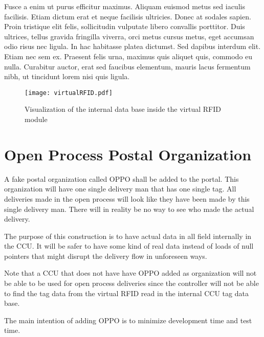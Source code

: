 \documentclass[titlepage = true]{scrartcl}
\begin{document}
Fusce a enim ut purus efficitur maximus. Aliquam euismod metus sed iaculis facilisis. Etiam dictum erat et neque facilisis ultricies. Donec at sodales sapien. Proin tristique elit felis, sollicitudin vulputate libero convallis porttitor. Duis ultrices, tellus gravida fringilla viverra, orci metus cursus metus, eget accumsan odio risus nec ligula. In hac habitasse platea dictumst. Sed dapibus interdum elit. Etiam nec sem ex. Praesent felis urna, maximus quis aliquet quis, commodo eu nulla. Curabitur auctor, erat sed faucibus elementum, mauris lacus fermentum nibh, ut tincidunt lorem nisi quis ligula.

\begin{figure}[h]
\begin{center}
\texttt{[image: virtualRFID.pdf]}
\caption{Visualization of the internal data base inside the virtual RFID module}
\end{center}
\end{figure}



\section{Open Process Postal Organization}
A fake postal organization called OPPO shall be added to the portal. This organization will have one single delivery man that has one single tag. All deliveries made in the open process will look like they have been made by this single delivery man. There will in reality be no way to see who made the actual delivery.

The purpose of this construction is to have actual data in all field internally in the CCU. It will be safer to have some kind of real data instead of loads of null pointers that might disrupt the delivery flow in unforeseen ways.

Note that a CCU that does not have have OPPO added as organization will not be able to be used for open process deliveries since the controller will not be able to find the tag data from the virtual RFID read in the internal CCU tag data base.

The main intention of adding OPPO is to minimize development time and test time.
\end{document}
